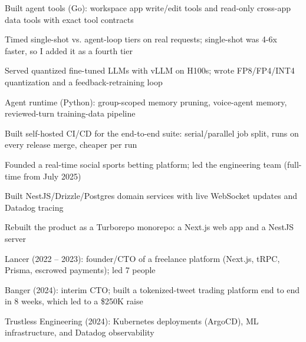 \documentclass[print]{jack-resume}
\begin{document}
\begin{tightemize}
    \item Built agent tools (Go): workspace app write/edit tools and read-only cross-app data tools with exact tool contracts
    \item Timed single-shot vs. agent-loop tiers on real requests; single-shot was 4-6x faster, so I added it as a fourth tier
    \item Served quantized fine-tuned LLMs with vLLM on H100s; wrote FP8/FP4/INT4 quantization and a feedback-retraining loop
    \item Agent runtime (Python): group-scoped memory pruning, voice-agent memory, reviewed-turn training-data pipeline
    \item Built self-hosted CI/CD for the end-to-end suite: serial/parallel job split, runs on every release merge, cheaper per run
\end{tightemize}
\sectionsep

\begin{tightemize}
    \item Founded a real-time social sports betting platform; led the engineering team (full-time from July 2025)
    \item Built NestJS/Drizzle/Postgres domain services with live WebSocket updates and Datadog tracing
    \item Rebuilt the product as a Turborepo monorepo: a Next.js web app and a NestJS server
\end{tightemize}
\sectionsep

\begin{tightemize}
    \item Lancer (2022 -- 2023): founder/CTO of a freelance platform (Next.js, tRPC, Prisma, escrowed payments); led 7 people
    \item Banger (2024): interim CTO; built a tokenized-tweet trading platform end to end in 8 weeks, which led to a \$250K raise
    \item Trustless Engineering (2024): Kubernetes deployments (ArgoCD), ML infrastructure, and Datadog observability
\end{tightemize}
\sectionsep
\end{document}

